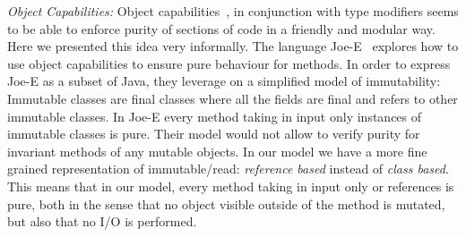 \noindent
\textit{Object Capabilities:}
Object capabilities~\cite{RobustComposition}, in conjunction with type modifiers seems to be able to
 enforce purity of sections of code in a friendly and modular way.
Here we presented this idea very informally.
The language Joe-E~\cite{finifter2008verifiable}
explores how to use object capabilities to ensure
pure behaviour for methods.
In order to express Joe-E as a subset of Java,
they leverage on a simplified model of immutability:
Immutable classes are final classes where all the fields are final and refers to other immutable classes.
In Joe-E every method taking in input only instances of immutable classes is pure.
Their model would not allow to verify purity for invariant methods of any mutable objects.
In our model we have a more fine grained representation of immutable/read:
 \emph{reference based} instead of \emph{class based}.
This means that in our model, every method taking in input only \Q@read@ or \Q@imm@ references is pure,
both in the sense that no object visible outside of the method is mutated, but also
that no I/O is performed.



